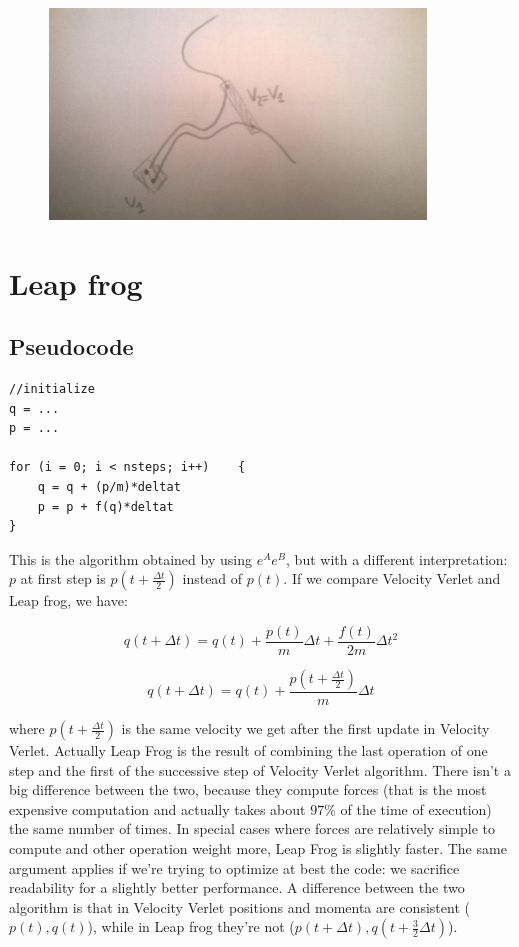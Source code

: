 \documentclass[a4paper, italian, openany]{book}
\begin{document}
\begin{figure}[H]
\centering
\includegraphics[width=100mm]{img/pic9.jpg}
\end{figure}

\section{Leap frog}

\subsection{Pseudocode}

\begin{lstlisting}
//initialize
q = ... 
p = ...

for (i = 0; i < nsteps; i++)	{
	q = q + (p/m)*deltat
	p = p + f(q)*deltat
}
\end{lstlisting}

This is the algorithm obtained by using $e^A e^B$, but with a different interpretation: $p$ at first step is $p(t+\frac{\Delta t}{2})$ instead of $p(t)$. If we compare Velocity Verlet and Leap frog, we have:

$$q(t+\Delta t) = q(t) + \frac{p(t)}{m}\Delta t + \frac{f(t)}{2m}\Delta t^2$$

$$q(t+\Delta t) = q(t) + \frac{p(t+\frac{\Delta t}{2})}{m} \Delta t$$

where $p(t+\frac{\Delta t}{2})$ is the same velocity we get after the first update in Velocity Verlet. Actually Leap Frog is the result of combining the last operation of one step and the first of the successive step of Velocity Verlet algorithm.\newline
There isn't a big difference between the two, because they compute forces (that is the most expensive computation and actually takes about $97\%$ of the time of execution) the same number of times. In special cases where forces are relatively simple to compute and other operation weight more, Leap Frog is slightly faster. The same argument applies if we're trying to optimize at best the code: we sacrifice readability for a slightly better performance.\newline
A difference between the two algorithm is that in Velocity Verlet positions and momenta are consistent ($p(t), q(t)$), while in Leap frog they're not ($p(t+\Delta t), q(t+\frac{3}{2}\Delta t)$).
\end{document}
